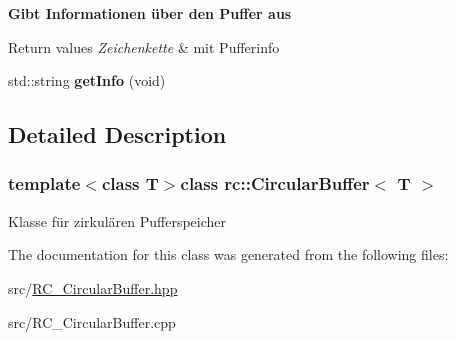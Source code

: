 \begin{Indent}{\bf Gibt Informationen über den Puffer aus}\par
{\em 
\begin{DoxyRetVals}{Return values}
{\em Zeichenkette} & mit Pufferinfo \\
\hline
\end{DoxyRetVals}
}\begin{DoxyCompactItemize}
\item 
\hypertarget{classrc_1_1CircularBuffer_a3bd7f616030a6cbf6b397e5c1e33d9f8}{std\+::string {\bfseries get\+Info} (void)}\label{classrc_1_1CircularBuffer_a3bd7f616030a6cbf6b397e5c1e33d9f8}

\end{DoxyCompactItemize}
\end{Indent}


\subsection{Detailed Description}
\subsubsection*{template$<$class T$>$class rc\+::\+Circular\+Buffer$<$ T $>$}

Klasse für zirkulären Pufferspeicher 

The documentation for this class was generated from the following files\+:\begin{DoxyCompactItemize}
\item 
src/\hyperlink{RC__CircularBuffer_8hpp}{R\+C\+\_\+\+Circular\+Buffer.\+hpp}\item 
src/R\+C\+\_\+\+Circular\+Buffer.\+cpp\end{DoxyCompactItemize}
